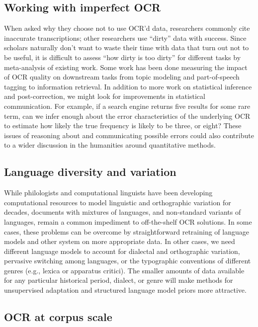 \documentclass[twoside,11pt]{report}
\begin{document}
\subsection{Working with imperfect OCR}

When asked why they choose not to use OCR'd data, researchers commonly cite inaccurate transcriptions; other researchers use ``dirty'' data with success. Since scholars naturally don't want to waste their time with data that turn out not to be useful, it is difficult to assess ``how dirty is too dirty'' for different tasks by meta-analysis of existing work. Some work has been done measuring the impact of OCR quality on downstream tasks from topic modeling and part-of-speech tagging to information retrieval. In addition to more work on statistical inference and post-correction, we might look for improvements in statistical communication. For example, if a search engine returns five results for some rare term, can we infer enough about the error characteristics of the underlying OCR to estimate how likely the true frequency is likely to be three, or eight? These issues of reasoning about and communicating possible errors could also contribute to a wider discussion in the humanities around quantitative methods.

\subsection{Language diversity and variation}

While philologists and computational linguists have been developing computational resources to model linguistic and orthographic variation for decades, documents with mixtures of languages, and non-standard variants of languages, remain a common impediment to off-the-shelf OCR solutions. In some cases, these problems can be overcome by straightforward retraining of language models and other system on more appropriate data. In other cases, we need different language models to account for dialectal and orthographic variation, pervasive switching among languages, or the typographic conventions of different genres (e.g., lexica or apparatus critici). The smaller amounts of data available for any particular historical period, dialect, or genre will make methods for unsupervised adaptation and structured language model priors more attractive.

\subsection{OCR at corpus scale}
\end{document}
